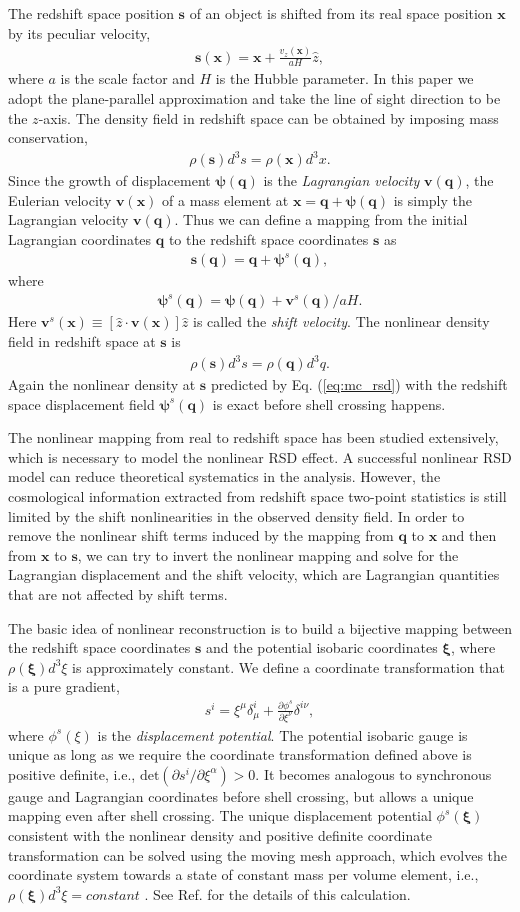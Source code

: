 \documentclass[aps,prx,twocolumn,superscriptaddress,groupedaddress,nofootinbib,amsfont]{revtex4}  %
\newcommand{\mr}{\mathrm}
\newcommand{\bea}{\begin{eqnarray}}
\newcommand{\eea}{\end{eqnarray}}
\newcommand{\bmp}{\bm{\psi}}
\newcommand{\bmv}{\bm{v}}
\newcommand{\bmx}{\bm{x}}
\newcommand{\bms}{\bm{s}}
\newcommand{\bmq}{\bm{q}}
\newcommand{\bmxi}{\bm{\xi}}
\begin{document}
The redshift space position $\bms$ of an object is shifted from its real space 
position $\bmx$ by its peculiar velocity,
\bea
\bms(\bmx)=\bmx+\frac{v_z(\bmx)}{aH}\hat{z},
\eea
where $a$ is the scale factor and $H$ is the Hubble parameter. In this paper 
we adopt the plane-parallel approximation and take the line of sight direction 
to be the $z$-axis. The density field in redshift space can be obtained by 
imposing mass conservation,
\bea
\rho(\bms)d^3s=\rho(\bmx)d^3x.
\eea
Since the growth of displacement $\bmp(\bmq)$ is the {\it Lagrangian velocity}
$\bmv(\bmq)$, the Eulerian velocity $\bmv(\bmx)$ of a mass element at 
$\bmx=\bmq+\bmp(\bmq)$ is simply the Lagrangian velocity $\bmv(\bmq)$.
Thus we can define a mapping from the initial Lagrangian coordinates $\bmq$ to 
the redshift space coordinates $\bms$ as
\bea
\bms(\bmq)=\bmq+\bmp^s(\bmq),
\eea
where
\bea
\bmp^s(\bmq)=\bmp(\bmq)+{\bmv^s(\bmq)}/{aH}.
\eea
Here $\bmv^s(\bmx)\equiv[\hat{z}\cdot\bmv(\bmx)]\hat{z}$ is called the {\it shift velocity}.
The nonlinear density field in redshift space at $\bms$ is 
\bea
\label{eq:mc_rsd}
\rho(\bms)d^3s=\rho(\bmq)d^3q.
\eea
Again the nonlinear density at $\bms$ predicted by Eq. (\ref{eq:mc_rsd})
with the redshift space displacement field $\bmp^s(\bmq)$ is exact before shell
crossing happens.

The nonlinear mapping from real to redshift space has been studied extensively,
which is necessary to model the nonlinear RSD effect. A successful nonlinear 
RSD model can reduce theoretical systematics in the analysis. However, the 
cosmological information extracted from redshift space two-point statistics 
is still limited by the shift nonlinearities in the observed density field. 
In order to remove the nonlinear shift terms induced by the mapping from $\bmq$
to $\bmx$ and then from $\bmx$ to $\bms$, we can try to invert the nonlinear 
mapping and solve for the Lagrangian displacement and the shift velocity, which
are Lagrangian quantities that are not affected by shift terms.

The basic idea of nonlinear reconstruction is to build a bijective mapping between the redshift space coordinates $\bms$ and the potential isobaric coordinates $\bmxi$, where $\rho(\bmxi)d^3\xi$ is approximately constant.
We define a coordinate transformation that is a pure gradient,
\bea
s^i=\xi^{\mu}\delta^i_{\mu}+\frac{\partial\phi^s}{\partial\xi^{\nu}}\delta^{i\nu},
\eea
where $\phi^s(\xi)$ is the {\it displacement potential}. 
The potential isobaric gauge is unique as long as we require the coordinate 
transformation defined above is positive definite, i.e., $\mr{det}(\partial s^i/\partial\xi^{\alpha})>0$. 
It becomes analogous to synchronous gauge and Lagrangian coordinates before 
shell crossing, but allows a unique mapping even after shell crossing.
The unique displacement potential $\phi^s(\bmxi)$ consistent with the nonlinear
density and positive definite coordinate transformation can be solved using
the moving mesh approach, which evolves the coordinate system towards a state 
of constant mass per volume element, i.e., $\rho(\bmxi)d^3\xi=constant$
\cite{1995ApJS..100..269P,1998ApJS..115...19P}.
See Ref. \cite{2016HMZ} for the details of this calculation.
\end{document}
